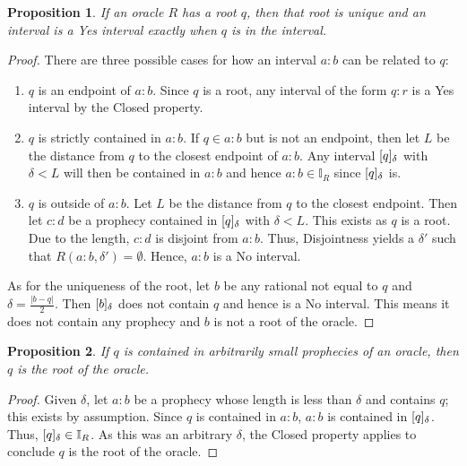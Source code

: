 \documentclass[12pt]{article}
\newtheorem{proposition}{Proposition}[section]
\begin{document}
\begin{proposition}\label{os:singular}
    If an oracle $R$ has a root $q$, then that root is unique and an interval is a Yes interval exactly when $q$ is in the interval.
\end{proposition}

\begin{proof}
    There are three possible cases for how an interval $a:b$ can be related to $q$:

    \begin{enumerate}
        \item $q$ is an endpoint of $a:b$. Since $q$ is a root, any interval of the form $q:r$ is a Yes interval by the Closed property.
        \item $q$ is strictly contained in $a:b$. If $q \in a:b$ but is not an endpoint, then let $L$ be the distance from $q$ to the closest endpoint of $a:b$. Any interval $[q]_{\delta}$ with $\delta < L $ will then be contained in $a:b$ and hence $a:b \in \mathbb{I}_R$ since $[q]_{\delta}$ is. 
        \item $q$ is outside of $a:b$.  Let $L$ be the distance from $q$ to the closest endpoint. Then let $c:d$ be a prophecy contained in $[q]_{\delta}$ with $\delta < L$. This exists as $q$ is a root. Due to the length, $c:d$ is disjoint from $a:b$. Thus, Disjointness yields a $\delta'$ such that $R(a:b, \delta')= \emptyset$. Hence, $a:b$ is a No interval. 
    \end{enumerate}
    
    As for the uniqueness of the root, let $b$ be any rational not equal to $q$ and $\delta = \frac{|b-q|}{2}$. Then $[b]_{\delta}$ does not contain $q$ and hence is a No interval. This means it does not contain any prophecy and $b$ is not a root of the oracle. 
\end{proof}


\begin{proposition}\label{os:rootsmallpro}
    If $q$ is contained in arbitrarily small prophecies of an oracle, then $q$ is the root of the oracle. 
\end{proposition}

\begin{proof}
    Given $\delta$, let $a:b$ be a prophecy whose length is less than $\delta$ and contains $q$; this exists by assumption. Since $q$ is contained in $a:b$, $a:b$ is contained in $[q]_{\delta}$. Thus, $[q]_{\delta} \in \mathbb{I}_R$. As this was an arbitrary $\delta$, the Closed property applies to conclude  $q$ is the root of the oracle. 
\end{proof}
\end{document}
